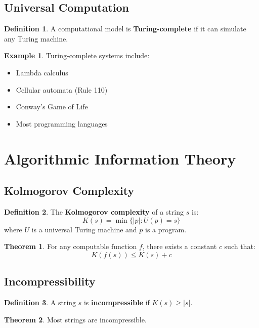 \documentclass[11pt]{article}
\theoremstyle{definition}
\newtheorem{definition}{Definition}[section]
\newtheorem{theorem}{Theorem}[section]
\newtheorem{example}{Example}[section]
\begin{document}
\subsection{Universal Computation}
\begin{definition}
A computational model is \textbf{Turing-complete} if it can simulate any Turing machine.
\end{definition}

\begin{example}
Turing-complete systems include:
\begin{itemize}
    \item Lambda calculus
    \item Cellular automata (Rule 110)
    \item Conway's Game of Life
    \item Most programming languages
\end{itemize}
\end{example}

\section{Algorithmic Information Theory}

\subsection{Kolmogorov Complexity}
\begin{definition}
The \textbf{Kolmogorov complexity} of a string $s$ is:
$$K(s) = \min\{|p| : U(p) = s\}$$
where $U$ is a universal Turing machine and $p$ is a program.
\end{definition}

\begin{theorem}
For any computable function $f$, there exists a constant $c$ such that:
$$K(f(s)) \leq K(s) + c$$
\end{theorem}

\subsection{Incompressibility}
\begin{definition}
A string $s$ is \textbf{incompressible} if $K(s) \geq |s|$.
\end{definition}

\begin{theorem}
Most strings are incompressible.
\end{theorem}
\end{document}

